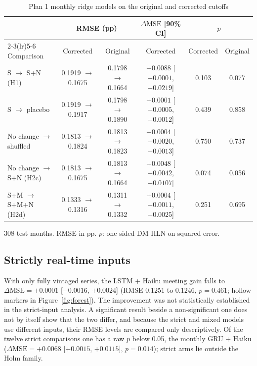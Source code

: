 \documentclass[11pt]{article}
\newcommand{\dmse}{\Delta\mathrm{MSE}}
\begin{document}
\begin{table}[ht]\centering\footnotesize\setlength{\tabcolsep}{3.5pt}
\begin{threeparttable}
\caption{Plan 1 monthly ridge models on the original and corrected cutoffs}\label{tab:cutoff}
\begin{tabular}{lccccc}
\toprule
& \multicolumn{2}{c}{RMSE (pp)} & $\dmse$ [90\% CI] & \multicolumn{2}{c}{$p$} \\ \cmidrule(lr){2-3}\cmidrule(lr){5-6}
Comparison & Corrected & Original & Corrected & Corrected & Original \\ \midrule
S $\to$ S+N (H1) & 0.1919 $\to$ 0.1675 & 0.1798 $\to$ 0.1664 & $+0.0088$ [$-0.0001$, $+0.0219$] & 0.103 & 0.077 \\
S $\to$ placebo & 0.1919 $\to$ 0.1917 & 0.1798 $\to$ 0.1890 & $+0.0001$ [$-0.0005$, $+0.0012$] & 0.439 & 0.858 \\
No change $\to$ shuffled & 0.1813 $\to$ 0.1824 & 0.1813 $\to$ 0.1823 & $-0.0004$ [$-0.0020$, $+0.0013$] & 0.750 & 0.737 \\
No change $\to$ S+N (H2c) & 0.1813 $\to$ 0.1675 & 0.1813 $\to$ 0.1664 & $+0.0048$ [$-0.0042$, $+0.0107$] & 0.074 & 0.056 \\
S+M $\to$ S+M+N (H2d) & 0.1333 $\to$ 0.1316 & 0.1311 $\to$ 0.1332 & $+0.0004$ [$-0.0011$, $+0.0025$] & 0.251 & 0.695 \\
\bottomrule
\end{tabular}
\begin{tablenotes}\footnotesize
\item 308 test months. RMSE in pp. $p$: one-sided DM-HLN on squared error.
\end{tablenotes}
\end{threeparttable}
\end{table}

\subsection{Strictly real-time inputs}

With only fully vintaged series, the LSTM + Haiku meeting gain falls to $\dmse=+0.0001$ [$-0.0016$, $+0.0024$]
(RMSE 0.1251 to 0.1246, $p=0.461$; hollow markers in Figure~\ref{fig:forest}). The improvement was not
statistically established in the strict-input analysis. A significant result beside a non-significant one does
not by itself show that the two differ, and because the strict and mixed models use different inputs, their RMSE
levels are compared only descriptively. Of the twelve strict comparisons one has a raw $p$ below 0.05, the monthly
GRU + Haiku ($\dmse=+0.0068$ [$+0.0015$, $+0.0115$], $p=0.014$); strict arms lie outside the Holm family.
\end{document}
